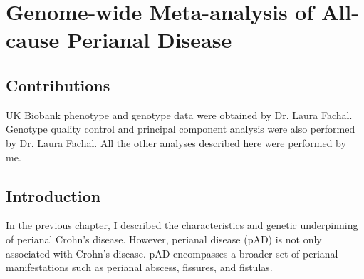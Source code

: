 \chapter{Genome-wide Meta-analysis of All-cause Perianal Disease}

\ifpdf
    \graphicspath{{Chapter3/Figs/Raster/}{Chapter3/Figs/PDF/}{Chapter3/Figs/}}
\else
    \graphicspath{{Chapter3/Figs/Vector/}{Chapter3/Figs/}}
\fi

\section{Contributions}
UK Biobank phenotype and genotype data were obtained by Dr. Laura Fachal. Genotype quality control and principal component analysis were also performed by Dr. Laura Fachal. All the other analyses described here were performed by me. 
\section{Introduction}

In the previous chapter, I described the characteristics and genetic underpinning of perianal Crohn's disease. However, perianal disease (pAD) is not only associated with Crohn's disease. pAD encompasses a broader set of perianal manifestations such as perianal abscess, fissures, and fistulas.\\

